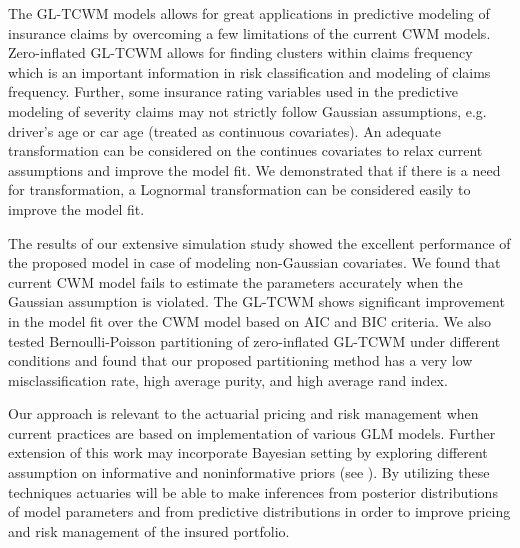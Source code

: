 \documentclass[11pt,letterpaper]{article}
\numberwithin{equation}{section}
\numberwithin{equation}{section}
\numberwithin{equation}{section}
\begin{document}
The GL-TCWM models allows for great applications in predictive modeling of insurance claims by overcoming a few limitations of the current CWM models. Zero-inflated GL-TCWM allows for finding clusters within claims frequency which is an important information in risk classification and modeling of claims frequency. Further, some insurance rating variables used in the predictive modeling of severity claims may not strictly follow Gaussian assumptions, e.g. driver's age or car age (treated as continuous covariates). An adequate transformation can be considered on the continues covariates to relax current assumptions and improve the model fit. We demonstrated that if there is a need for transformation, a Lognormal transformation can be considered easily to improve the model fit. 

The results of our extensive simulation study showed the excellent performance of the proposed model in case of modeling non-Gaussian covariates. We found  that current CWM model fails to estimate the parameters accurately when the Gaussian assumption is violated. The GL-TCWM shows significant improvement in the model fit over the CWM model based on AIC and BIC criteria. We also tested Bernoulli-Poisson partitioning of zero-inflated GL-TCWM under different conditions and found that our proposed partitioning method has a very low misclassification rate, high average purity, and high average rand index.

Our approach is relevant to the actuarial pricing and risk management when current practices are based on implementation of various GLM models. Further extension of this work may incorporate Bayesian setting by exploring different assumption on informative and noninformative priors (see \cite{Ibrahim+Laud:1991}). By utilizing these techniques actuaries will be able to make inferences from posterior distributions of model parameters and from predictive distributions in order to improve pricing and risk management of the insured portfolio. 



\end{document}
